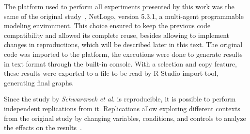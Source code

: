 The platform used to perform all experiments presented by this work was the same of the original study~\cite{MAS07}, NetLogo, version 5.3.1, a multi-agent programmable modeling environment. This choice ensured to keep the previous code compatibility and allowed its complete reuse, besides allowing to implement changes in reproductions, which will be described later in this text. The original code was imported to the platform, the executions were done to generate results in text format through the built-in console. With a selection and copy feature, these results were exported to a file to be read by R Studio import tool, generating final graphs.  



Since the study by \textit{Schwarzrock et al.}\cite{MAS07} is reproducible, it is possible to perform independent replications from it. Replications allow exploring different contexts from the original study  by changing variables, conditions, and controls to analyze the effects on the results~\cite{exp03}. 
